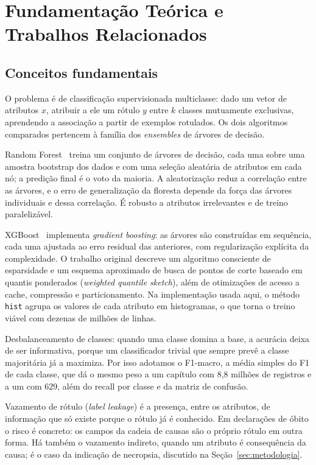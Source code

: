 \documentclass[12pt]{article}
\begin{document}
\section{Fundamentação Teórica e Trabalhos Relacionados}

\subsection{Conceitos fundamentais}

O problema é de classificação supervisionada multiclasse: dado um vetor de atributos $x$, atribuir a ele um rótulo $y$ entre $k$ classes mutuamente exclusivas, aprendendo a associação a partir de exemplos rotulados. Os dois algoritmos comparados pertencem à família dos \emph{ensembles} de árvores de decisão.

Random Forest~\cite{breiman2001} treina um conjunto de árvores de decisão, cada uma sobre uma amostra bootstrap dos dados e com uma seleção aleatória de atributos em cada nó; a predição final é o voto da maioria. A aleatorização reduz a correlação entre as árvores, e o erro de generalização da floresta depende da força das árvores individuais e dessa correlação. É robusto a atributos irrelevantes e de treino paralelizável.

XGBoost~\cite{chen2016} implementa \emph{gradient boosting}: as árvores são construídas em sequência, cada uma ajustada ao erro residual das anteriores, com regularização explícita da complexidade. O trabalho original descreve um algoritmo consciente de esparsidade e um esquema aproximado de busca de pontos de corte baseado em quantis ponderados (\emph{weighted quantile sketch}), além de otimizações de acesso a cache, compressão e particionamento. Na implementação usada aqui, o método \texttt{hist} agrupa os valores de cada atributo em histogramas, o que torna o treino viável com dezenas de milhões de linhas.

Desbalanceamento de classes: quando uma classe domina a base, a acurácia deixa de ser informativa, porque um classificador trivial que sempre prevê a classe majoritária já a maximiza. Por isso adotamos o F1-macro, a média simples do F1 de cada classe, que dá o mesmo peso a um capítulo com 8,8 milhões de registros e a um com 629, além do recall por classe e da matriz de confusão.

Vazamento de rótulo (\emph{label leakage}) é a presença, entre os atributos, de informação que só existe porque o rótulo já é conhecido. Em declarações de óbito o risco é concreto: os campos da cadeia de causas são o próprio rótulo em outra forma. Há também o vazamento indireto, quando um atributo é consequência da causa; é o caso da indicação de necropsia, discutido na Seção~\ref{sec:metodologia}.
\end{document}
